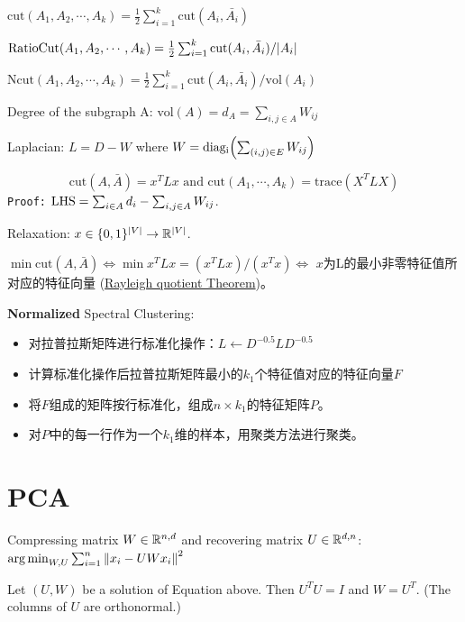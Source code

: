 \documentclass[a4paper,landscape]{article}
\begin{document}
\begin{tiny}
\begin{multicols}{4}
\begin{defi}
			$\mathrm{cut}(A_1,A_2,\cdots,A_k)=\frac{1}{2}\sum_{i=1}^k\mathrm{cut}(A_i,\bar{A_i})$

			$\mathrm{RatioCut}(A_1,A_2,\cdots,A_k)=\frac{1}{2}\sum_{i=1}^k\mathrm{cut}(A_i,\bar{A_i})/\qty|A_i|$

			$\mathrm{Ncut}(A_1,A_2,\cdots,A_k)=\frac{1}{2}\sum_{i=1}^k\mathrm{cut}(A_i,\bar{A_i})/\mathrm{vol}(A_i)$

			Degree of the subgraph A: $\mathrm{vol}(A)=d_A=\sum_{i,j\in A} W_{ij}$

			Laplacian: $L=D-W$ where $W=\mathrm{diag_i}\qty(\sum_{(i,j)\in E}W_{ij})$
		\end{defi}
		\begin{thm}
			\[
				\mathrm{cut}(A,\bar{A})=x^TLx
				\text{ and }
				\mathrm{cut}(A_1,\cdots,A_k)=\mathrm{trace}(X^TLX)
			\]
			\texttt{Proof:}
			$\text{LHS}=\sum_{i\in A}d_i-\sum_{i,j\in A}W_{ij}$.
		\end{thm}
		\begin{thm}Relaxation: $x\in \{0,1\}^\qty|V|\rightarrow\mathbb{R}^\qty|V|$.

			$\min \mathrm{cut}(A,\bar{A}) \iff \min x^TLx=(x^TLx)/(x^Tx) \iff$ $x$为L的最小非零特征值所对应的特征向量 (\href{https://en.wikipedia.org/wiki/Rayleigh_quotient}{Rayleigh quotient Theorem})。
		\end{thm}
		\begin{defi}\textbf{Normalized} Spectral Clustering:
			\begin{itemize}
				\item
				      对拉普拉斯矩阵进行标准化操作：$L\gets D^{-0.5}LD^{-0.5}$
				\item
				      计算标准化操作后拉普拉斯矩阵最小的$k_1$个特征值对应的特征向量$F$
				\item
				      将$F$组成的矩阵按行标准化，组成$n\times k_1$的特征矩阵$P$。
				\item
				      对$P$中的每一行作为一个$k_1$维的样本，用聚类方法进行聚类。
			\end{itemize}
		\end{defi}

		\section{PCA}
		Compressing matrix $W\in\mathbb{R}^{n,d}$ and recovering matrix  $U\in\mathbb{R}^{d,n}$:
		$\mathop{\arg\min}_{W,U}\sum^{n}_{i=1} \norm{x_i-UWx_i}^2$

		\begin{lemma}
			Let $(U,W)$ be a solution of Equation above. Then $U^TU=I$ and  $W=U^T$. (The columns of $U$ are orthonormal.)
		\end{lemma}


\end{multicols}
\end{tiny}
\end{document}
